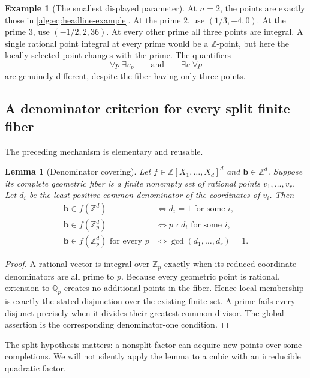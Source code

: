 \documentclass[11pt]{article}
\numberwithin{equation}{section}
\theoremstyle{plain}
\theoremstyle{plain}
\newtheorem{lemma}[lemma]{Lemma}
\theoremstyle{plain}
\theoremstyle{definition}
\theoremstyle{definition}
\theoremstyle{definition}
\newtheorem{example}[example]{Example}
\theoremstyle{remark}
\newcommand{\Z}{\mathbb Z}\newcommand{\Q}{\mathbb Q}
\newcommand{\target}{\boldsymbol b}
\begin{document}
\begin{example}[The smallest displayed parameter]
At $n=2$, the points are exactly those in
\eqref{alg:eq:headline-example}. At the prime $2$, use $(1/3,-4,0)$.
At the prime $3$, use $(-1/2,2,36)$. At every other prime all three
points are integral. A single rational point integral at every prime
would be a $\Z$-point, but here the locally selected point changes with
the prime. The quantifiers
\[
 \forall p\;\exists v_p
 \qquad\text{and}\qquad
 \exists v\;\forall p
\]
are genuinely different, despite the fiber having only three points.
\end{example}

\subsection{A denominator criterion for every split finite fiber}
The preceding mechanism is elementary and reusable.

\begin{lemma}[Denominator covering]\label{alg:lem:denominator}
Let $f\in\Z[X_1,\ldots,X_d]^d$ and $\target\in\Z^d$. Suppose its complete
geometric fiber is a finite nonempty set of rational points
$v_1,\ldots,v_r$. Let $d_i$ be the least positive common denominator of
the coordinates of $v_i$. Then
\begin{align*}
 \target\in f(\Z^d)&\iff d_i=1\text{ for some }i,\\
 \target\in f(\Z_p^d)&\iff p\nmid d_i\text{ for some }i,\\
 \target\in f(\Z_p^d)\text{ for every }p
   &\iff\gcd(d_1,\ldots,d_r)=1.
\end{align*}
\end{lemma}
\begin{proof}
A rational vector is integral over $\Z_p$ exactly when its reduced
coordinate denominators are all prime to $p$. Because every geometric
point is rational, extension to $\Q_p$ creates no additional points in
the fiber. Hence local membership is exactly the stated disjunction over
the existing finite set. A prime fails every disjunct precisely when it
divides their greatest common divisor. The global assertion is the
corresponding denominator-one condition.
\end{proof}
The split hypothesis matters: a nonsplit factor can acquire new points
over some completions. We will not silently apply the lemma to a cubic
with an irreducible quadratic factor.
\end{document}
